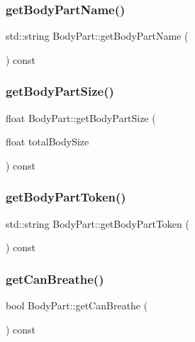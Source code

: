 \subsubsection{\texorpdfstring{get\+Body\+Part\+Name()}{getBodyPartName()}}
{\footnotesize\ttfamily std\+::string Body\+Part\+::get\+Body\+Part\+Name (\begin{DoxyParamCaption}{ }\end{DoxyParamCaption}) const}

\mbox{\label{class_body_part_af6ffb527a93262f5f44eb46e0cc406b8}} 
\subsubsection{\texorpdfstring{get\+Body\+Part\+Size()}{getBodyPartSize()}}
{\footnotesize\ttfamily float Body\+Part\+::get\+Body\+Part\+Size (\begin{DoxyParamCaption}\item[{float}]{total\+Body\+Size }\end{DoxyParamCaption}) const}

\mbox{\label{class_body_part_a9768feacb428c5611d0a8f58a0540618}} 
\subsubsection{\texorpdfstring{get\+Body\+Part\+Token()}{getBodyPartToken()}}
{\footnotesize\ttfamily std\+::string Body\+Part\+::get\+Body\+Part\+Token (\begin{DoxyParamCaption}{ }\end{DoxyParamCaption}) const}

\mbox{\label{class_body_part_a9bbc06713cb6b2d0c6c978e5b307d85b}} 
\subsubsection{\texorpdfstring{get\+Can\+Breathe()}{getCanBreathe()}}
{\footnotesize\ttfamily bool Body\+Part\+::get\+Can\+Breathe (\begin{DoxyParamCaption}{ }\end{DoxyParamCaption}) const}

